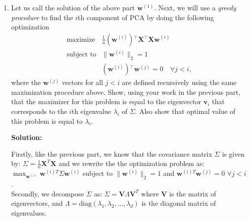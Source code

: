 \documentclass{article}
\newcommand{\mat}[1]{\mathbf{#1}}
\renewcommand{\vec}[1]{\boldsymbol{\mathbf{#1}}}
\newcommand{\tran}{{}^{\!\top\!}}
\newcommand{\T}{\tran}
\newenvironment{solution}{\color{blue} \smallskip \textbf{Solution:}}{}
\begin{document}
\begin{enumerate}
\begin{solution}
Finally ,to maximize \(\sum_{i=1}^{d} \lambda_i a_i^2\) subject to the constraint \(\|\mathbf{w}\|_2 = 1\), or equivalently \(\sum_{i=1}^{d} a_i^2 = 1\), the maximum value is achieved when all the weight is placed on the largest eigenvalue \(\lambda_1\). This occurs when \(a_1 = 1\) and \(a_2 = a_3 = \dots = a_d = 0\).


    
    
    
    
\end{solution}

\newpage
\item Let us call the solution of the above part $\vec{w}^{(1)}$.  Next, we will use a \emph{greedy
procedure} to find the $i$th component of PCA by doing the following optimization
\begin{equation}
  \begin{array}{ll}
    \text{maximize}   & \frac{1}{n}(\vec{w}^{(i)})\T \mat{X}\T \mat{X} \vec{w}^{(i)} \\
    \text{subject to}
        & \|\vec{w}^{(i)}\|_{2} = 1 \\
        & (\vec{w}^{(i)})\T \vec{w}^{(j)} = 0 \quad \forall j < i,
  \end{array}
\end{equation}
where the $\mat{w}^{(j)}$ vectors for all $j < i$ are defined recursively using the same maximization procedure above.
Show, using your work in the previous part, that the maximizer for this problem is equal to the eigenvector $\vec{v}_i$ that corresponds to the
$i$th eigenvalue $\lambda_i$ of $\Sigma$. Also show that optimal value of this problem is
equal to $\lambda_i$.

\begin{solution}

Firstly, like the previous part, we know that the covariance matrix \(\Sigma\) is given by:
\(\Sigma = \frac{1}{n} \mathbf{X}^T \mathbf{X}\) and we rewrite the the optimization problem as:
\(\max_{\mathbf{w}^{(i)}} \mathbf{w}^{(i)T} \Sigma \mathbf{w}^{(i)}\)
subject to \(\|\mathbf{w}^{(i)}\|_2 = 1\) and \(\mathbf{w}^{(i)T} \mathbf{w}^{(j)} = 0 \,\, \forall j < i\).\\

Secondly, we decompose \(\Sigma\) as: 
\(\Sigma = \mathbf{V} \Lambda \mathbf{V}^T\) where \(\mathbf{V}\) is the matrix of eigenvectors, and \(\Lambda = \text{diag}(\lambda_1, \lambda_2, \dots, \lambda_d)\) is the diagonal matrix of eigenvalues.\\


\end{solution}
\end{enumerate}
\end{document}
